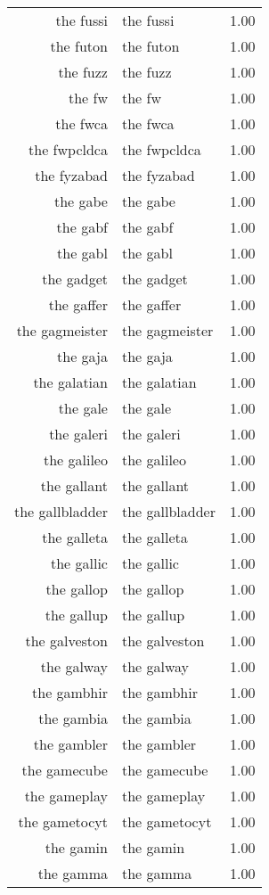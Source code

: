 \begin{table}[ht]
\begin{tabular}{rlr}
  the fussi & the fussi & 1.00 \\ 
  the futon & the futon & 1.00 \\ 
  the fuzz & the fuzz & 1.00 \\ 
  the fw & the fw & 1.00 \\ 
  the fwca & the fwca & 1.00 \\ 
  the fwpcldca & the fwpcldca & 1.00 \\ 
  the fyzabad & the fyzabad & 1.00 \\ 
  the gabe & the gabe & 1.00 \\ 
  the gabf & the gabf & 1.00 \\ 
  the gabl & the gabl & 1.00 \\ 
  the gadget & the gadget & 1.00 \\ 
  the gaffer & the gaffer & 1.00 \\ 
  the gagmeister & the gagmeister & 1.00 \\ 
  the gaja & the gaja & 1.00 \\ 
  the galatian & the galatian & 1.00 \\ 
  the gale & the gale & 1.00 \\ 
  the galeri & the galeri & 1.00 \\ 
  the galileo & the galileo & 1.00 \\ 
  the gallant & the gallant & 1.00 \\ 
  the gallbladder & the gallbladder & 1.00 \\ 
  the galleta & the galleta & 1.00 \\ 
  the gallic & the gallic & 1.00 \\ 
  the gallop & the gallop & 1.00 \\ 
  the gallup & the gallup & 1.00 \\ 
  the galveston & the galveston & 1.00 \\ 
  the galway & the galway & 1.00 \\ 
  the gambhir & the gambhir & 1.00 \\ 
  the gambia & the gambia & 1.00 \\ 
  the gambler & the gambler & 1.00 \\ 
  the gamecube & the gamecube & 1.00 \\ 
  the gameplay & the gameplay & 1.00 \\ 
  the gametocyt & the gametocyt & 1.00 \\ 
  the gamin & the gamin & 1.00 \\ 
  the gamma & the gamma & 1.00 \\ 

\end{tabular}
\end{table}
